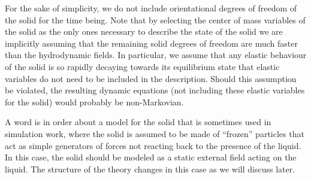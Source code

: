 \documentclass[b5paper,openright,11pt]{book}
\begin{document}
For the sake of simplicity, we do not include orientational degrees of
freedom of the  solid for the time being.  Note  that by selecting the
center of  mass variables of the  solid as the only  ones necessary to
describe the  state of the solid  we are implicitly assuming  that the
remaining  solid  degrees   of  freedom  are  much   faster  than  the
hydrodynamic  fields.   In  particular,  we assume  that  any  elastic
behaviour of the solid is  so rapidly decaying towards its equilibrium
state  that elastic  variables  do  not need  to  be  included in  the
description. Should this assumption be violated, the resulting dynamic
equations (not including  these elastic variables for the solid)
would probably  be non-Markovian.

A word is in order about a  model for the solid that is sometimes used
in  simulation work,  where the  solid  is  assumed to  be made  of
``frozen''  particles that  act  as simple  generators  of forces  not
reacting back  to the presence of  the liquid. In this  case, the solid
should be modeled as a static external field acting on the liquid. The
structure of the theory changes in this case as we will discuss later. 
\end{document}

